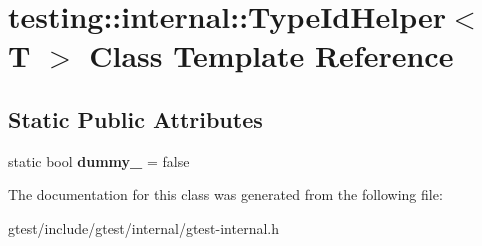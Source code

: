 \hypertarget{classtesting_1_1internal_1_1TypeIdHelper}{}\section{testing\+:\+:internal\+:\+:Type\+Id\+Helper$<$ T $>$ Class Template Reference}
\label{classtesting_1_1internal_1_1TypeIdHelper}
\subsection*{Static Public Attributes}
\begin{DoxyCompactItemize}
\item 
\mbox{\label{classtesting_1_1internal_1_1TypeIdHelper_a372268b1520d965d0bdf01ebad3d270e}} 
static bool {\bfseries dummy\+\_\+} = false
\end{DoxyCompactItemize}


The documentation for this class was generated from the following file\+:\begin{DoxyCompactItemize}
\item 
gtest/include/gtest/internal/gtest-\/internal.\+h\end{DoxyCompactItemize}
